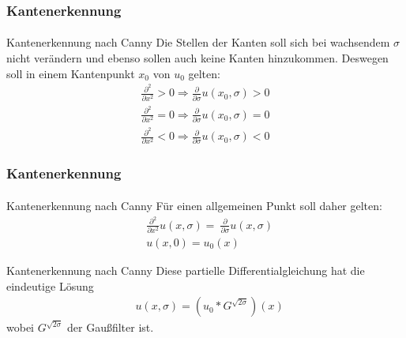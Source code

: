 \documentclass{beamer}
\begin{document}
\begin{frame}
    \frametitle{Kantenerkennung}
\framesubtitle{}

\begin{block}{Kantenerkennung nach Canny}
Die Stellen der Kanten soll sich bei wachsendem $\sigma$ nicht verändern und ebenso sollen auch keine Kanten hinzukommen. 
Deswegen soll in einem Kantenpunkt $x_0$ von $u_0$ gelten:
\begin{align*}
\frac{\partial^2}{\partial x^2} > 0 \Rightarrow \frac{\partial}{\partial \sigma}  u(x_0, \sigma) > 0 \\
\frac{\partial^2}{\partial x^2} = 0 \Rightarrow \frac{\partial}{\partial \sigma}  u(x_0, \sigma) = 0 \\
\frac{\partial^2}{\partial x^2} < 0 \Rightarrow \frac{\partial}{\partial \sigma}  u(x_0, \sigma) <0
\end{align*}
 \end{block}

 \end{frame}

\begin{frame}
    \frametitle{Kantenerkennung}
\framesubtitle{}

\begin{block}{Kantenerkennung nach Canny}
Für einen allgemeinen Punkt soll daher gelten:
\begin{align*}
&\frac{\partial^2}{\partial x^2}  u(x, \sigma)  =  \ \frac{\partial}{\partial \sigma}  u(x, \sigma)  \\
&  u(x, 0) = u_0(x) 
\end{align*}
 \end{block}

\begin{block}{Kantenerkennung nach Canny}
Diese partielle Differentialgleichung hat die eindeutige Lösung
\begin{align*}
&  u(x, \sigma) = (u_0 * G^{\sqrt{2\sigma}}) (x)
\end{align*}
wobei $ G^{\sqrt{2\sigma}}$ der Gaußfilter ist.
 \end{block}

 \end{frame}
\end{document}

